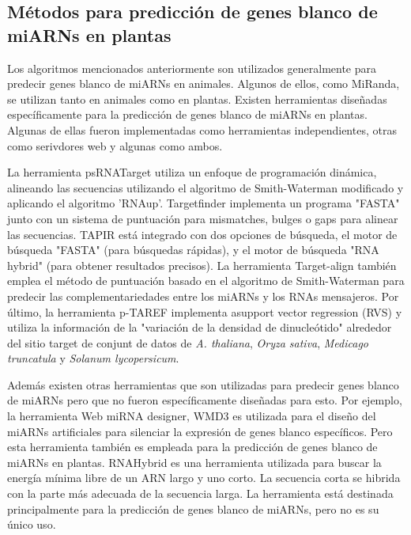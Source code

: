 \subsection{Métodos para predicción de genes blanco de miARNs en plantas}
Los algoritmos mencionados anteriormente son utilizados generalmente para predecir genes blanco de miARNs en animales.
Algunos de ellos, como MiRanda, se utilizan tanto en animales como en plantas.
Existen herramientas diseñadas específicamente para la predicción de genes blanco de miARNs en plantas.
Algunas de ellas fueron implementadas como herramientas independientes, otras como serivdores web y algunas como ambos.

La herramienta psRNATarget \citep{pmid21622958} utiliza un enfoque de programación dinámica, alineando las secuencias utilizando el algoritmo de Smith-Waterman modificado y aplicando el algoritmo 'RNAup'.
Targetfinder \citep{pmid15598838} implementa un programa "FASTA" junto con un sistema de puntuación para mismatches, bulges o gaps para alinear las secuencias.
TAPIR \citep{pmid20430753} está integrado con dos opciones de búsqueda, el motor de búsqueda "FASTA" (para búsquedas rápidas), y el motor de búsqueda "RNA hybrid" (para obtener resultados precisos).
La herramienta Target-align \citep{pmid20934992} también emplea el método de puntuación basado en el algoritmo de Smith-Waterman para predecir las complementariedades entre los miARNs y los RNAs mensajeros.
Por último, la herramienta p-TAREF \citep{pmid22206472} implementa asupport vector regression (RVS) y utiliza la información de la "variación de la densidad de dinucleótido" alrededor del sitio target de conjunt de datos de \textit{A. thaliana}, \textit{Oryza sativa}, \textit{Medicago truncatula} y \textit{Solanum lycopersicum}.

Además existen otras herramientas que son utilizadas para predecir genes blanco de miARNs pero que no fueron específicamente diseñadas para esto.
Por ejemplo, la herramienta  Web miRNA designer, WMD3 \citep{pmid18269576} es utilizada para el diseño del miARNs artificiales para silenciar la expresión de genes blanco específicos.
Pero esta herramienta también es empleada para la predicción de genes blanco de miARNs en plantas.
RNAHybrid \citep{Kruger01072006} es una herramienta utilizada para buscar la energía mínima libre de un ARN largo y uno corto.
La secuencia corta se hibrida con la parte más adecuada de la secuencia larga.
La herramienta está destinada principalmente para la predicción de genes blanco de miARNs, pero no es su único uso.

